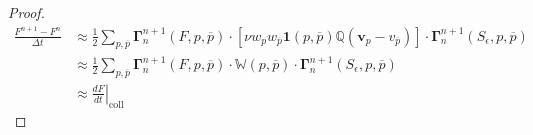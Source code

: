 \documentclass[10pt,a4paper]{amsart}
\begin{document}
\begin{proof}
\begin{align*}
\frac{F^{n+1} - F^{n}}{\Delta t} &\approx \frac{1}{2} \sum_{p,\overline{p}} \boldsymbol{\Gamma}^{n+1}_{n} (F,p,\overline{p}) \cdot \left[ \nu w_{p} w_{\overline{p}} \boldsymbol{1}(p, \overline{p}) \mathbb{Q}\left( \boldsymbol{v}_p - v_{\overline{p}}\right) \right] \cdot \boldsymbol{\Gamma}^{n+1}_{n} (S_{\epsilon},p,\overline{p}) \\
&\approx \frac{1}{2} \sum_{p,\overline{p}} \boldsymbol{\Gamma}^{n+1}_{n} (F,p,\overline{p}) \cdot \mathbb{W}(p, \overline{p}) \cdot \boldsymbol{\Gamma}^{n+1}_{n} (S_{\epsilon},p,\overline{p})\\
&\approx  \left. \frac{d F}{d t}\right|_{\text {coll }}
\end{align*}
\end{proof}
\end{document}
